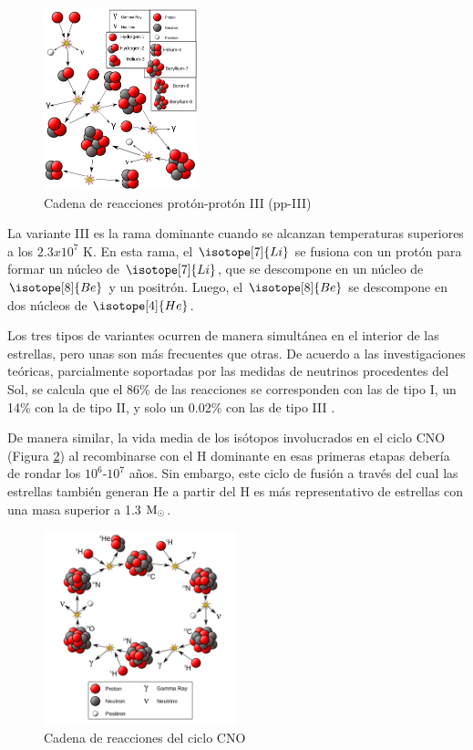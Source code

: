 \begin{figure}
	\centering
	\includegraphics[width=0.4\textwidth]{img/tesis/pp-III.png}
	\caption {Cadena de reacciones protón-protón III (pp-III)}
	\label{fig:pp-III}
\end{figure}

La variante III es la rama dominante cuando se alcanzan temperaturas superiores a los $2.3x10^7$ K. En esta rama, el $\isotope[7]{Li}$ se fusiona con un protón para formar un núcleo de $\isotope[7]{Li}$, que se descompone en un núcleo de $\isotope[8]{Be}$ y un positrón. Luego, el $\isotope[8]{Be}$ se descompone en dos núcleos de $\isotope[4]{He}$.\par

Los tres tipos de variantes ocurren de manera simultánea en el interior de las estrellas, pero unas son más frecuentes que otras. De acuerdo a las investigaciones teóricas, parcialmente soportadas por las medidas de neutrinos procedentes del Sol, se calcula que el 86\% de las reacciones se corresponden con las de tipo I, un 14\% con la de tipo II, y solo un 0.02\% con las de tipo III \cite{Scholz2018}.


De manera similar, la vida media de los isótopos involucrados en el ciclo CNO (Figura \ref{fig:ciclo-cno}) al recombinarse con el H dominante en esas primeras etapas debería de rondar los $10^6$-$10^7$ años. Sin embargo, este ciclo de fusión a través del cual las estrellas también generan He a partir del H es más representativo de estrellas con una masa superior a 1.3 $\mathrm{M}_\odot$. 


\begin{figure}
	\centering
	\includegraphics[width=0.5\textwidth]{img/tesis/ciclo CNO.png}
	\caption {Cadena de reacciones del ciclo CNO}
	\label{fig:ciclo-cno}
\end{figure}


\endinput
